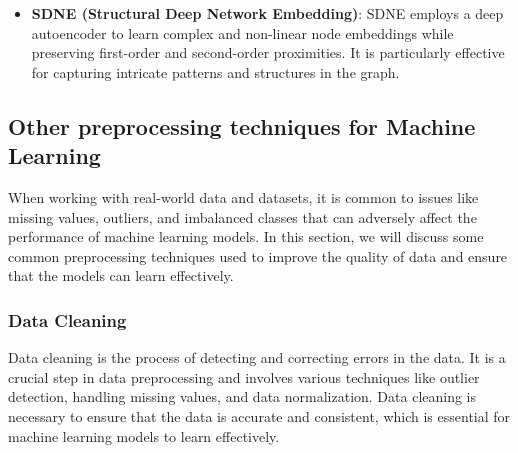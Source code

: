\begin{itemize}
        \item \textbf{SDNE (Structural Deep Network Embedding)}: SDNE employs a deep autoencoder to learn complex and non-linear node embeddings while preserving first-order and second-order proximities. It is particularly effective for capturing intricate patterns and structures in the graph.
    \end{itemize}

    \subsection{Other preprocessing techniques for Machine Learning}
    When working with real-world data and datasets, it is common to issues like missing values, outliers, and imbalanced classes that can adversely affect the performance of machine learning models. In this section, we will discuss some common preprocessing techniques used to improve the quality of data and ensure that the models can learn effectively.

    \subsubsection{Data Cleaning}
    Data cleaning is the process of detecting and correcting errors in the data. It is a crucial step in data preprocessing and involves various techniques like outlier detection, handling missing values, and data normalization. Data cleaning is necessary to ensure that the data is accurate and consistent, which is essential for machine learning models to learn effectively.


